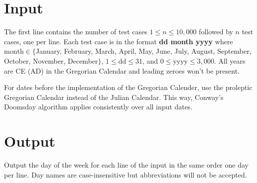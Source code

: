 \section*{Input}
The first line contains the number of test cases $1 \leq n \leq 10,000$ followed
by $n$ test cases, one per line. Each test case is in the format \textbf{dd month yyyy}
where $\text{month} \in \{$January, February, March, April, May, June, July, August,
September, October, November, December$\}$, $1 \leq \text{dd} \leq 31$, and $0 \leq
\text{yyyy} \leq 3,000$. All years are CE (AD) in the Gregorian Calendar and leading
zeroes won't be present.

For dates before the implementation of the Gregorian Calender, use the proleptic
Gregorian Calendar instead of the Julian Calendar. This way, Conway's Doomsday algorithm
applies consistently over all input dates.
\section*{Output}
Output the day of the week for each line of the input in the same order one
day per line. Day names are case-insensitive but abbreviations will not
be accepted.
